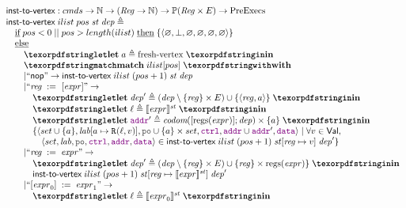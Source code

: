 {\small
\[
\inarr{
  \instToVrtx : \Carm \rightarrow \mathbb{N} \rightarrow (\Reg \rightarrow \mathbb{N}) \rightarrow \Pset(\Reg \times E)
    \rightarrow \PreExecutions \\
  \instToVrtx \; ilist \; pos \; \PromState \; \dep \defeq \\
  \quad \textIf   pos < 0 \; || \; pos > length(ilist) \; \textThen
    \{\tup{\emptyset, \bot, \emptyset, \emptyset, \emptyset, \emptyset}\} \\
  \quad \textElse \\
  \qquad
    \letdef{a}{{\rm fresh\text{-}vertex} } \\
  \qquad \kw{match} \; ilist[pos] \; \kw{with} \\
  \qquad
    \begin{array}{@{}l}
    | ``\nop" \rightarrow \instToVrtx \; ilist \; (pos + 1) \; \PromState \; \dep \\
    | ``\readInst{\reg}{\expr}" \rightarrow \\
      \quad \inarr{
        \letdef{\dep'}{(\dep \setminus \{\reg\} \times E) \cup \{\tup{\reg, a}\}} \\
        \letdef{\loc}{\semState{\expr}{\PromState}} \\
        \letdef{\lADDR'}{ \codom{[\regs(\expr)]; \dep} \times \{a\} } \\
        \{\tup{set \cup\{a\}, \lab[a \mapsto \rlab{}{\loc}{\val}], \lPO \cup \{a\} \times set, \lCTRL, \lADDR \cup \lADDR', \lDATA}
        \mid \forall \val \in \Val, \\
        \quad \tup{set, \lab, \lPO, \lCTRL, \lADDR, \lDATA} \in
          \instToVrtx \; ilist \; (pos + 1) \; \PromState[\reg \mapsto \val] \; \dep'\} \\
      } \\
    | ``\assignInst{\reg}{\expr}" \rightarrow \\
      \quad \inarr{
        \letdef{\dep'}{(\dep \setminus \{\reg\} \times E) \cup \{\reg\} \times \regs(\expr) \}} \\
        \instToVrtx \; ilist \; (pos + 1) \; \PromState[\reg \mapsto \semState{\expr}{\PromState}] \; \dep' \\
      } \\
    | ``\writeInst{\expr_0}{\expr_1}" \rightarrow \\
      \quad \inarr{
        \letdef{\loc}{\semState{\expr_0}{\PromState}} \\
}
\end{array}}\]}
